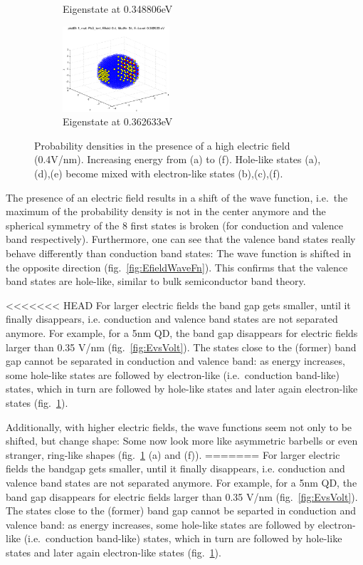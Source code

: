 \begin{figure}
\begin{subfigure}{150px}
		\caption{Eigenstate at 0.348806eV}
	\end{subfigure}
	\begin{subfigure}{150px}
		\includegraphics[width=150px]{Fig/Plots/r25v04Mod34}
		\caption{Eigenstate at 0.362633eV}
	\end{subfigure}
	\caption{Probability densities in the presence of a high electric field (0.4V/nm). Increasing energy from (a) to (f). Hole-like states (a),(d),(e) become mixed with electron-like states (b),(c),(f).}
	\label{fig:HighEfieldWaveFn}
\end{figure}


The presence of an electric field results in a shift of the wave function, i.e.~the maximum of the probability density is not in the center anymore and the spherical symmetry of the 8 first states is broken (for conduction and valence band respectively). Furthermore, one can see that the valence band states really behave differently than conduction band states: The wave function is shifted in the opposite direction (fig.~\ref{fig:EfieldWaveFn}). This confirms that the valence band states are hole-like, similar to bulk semiconductor band theory. 
	
<<<<<<< HEAD
For larger electric fields the band gap gets smaller, until it finally disappears, i.e. conduction and valence band states are not separated anymore. For example, for a 5nm  QD, the band gap disappears for electric fields larger than 0.35 V/nm (fig.~\ref{fig:EvsVolt}). The states close to the (former) band gap cannot be separated in conduction and valence band: as energy increases, some hole-like states are followed by electron-like (i.e.~conduction band-like) states, which in turn are followed by hole-like states and later again electron-like states (fig.~\ref{fig:HighEfieldWaveFn}).
	
Additionally, with higher electric fields, the wave functions seem not only to be shifted, but change shape: Some now look more like asymmetric barbells or even stranger, ring-like shapes (fig.~\ref{fig:HighEfieldWaveFn} (a) and (f)).
=======
For larger electric fields the bandgap gets smaller, until it finally disappears, i.e. conduction and valence band states are not separated anymore. For example, for a 5nm  QD, the band gap disappears for electric fields larger than 0.35 V/nm (fig.~\ref{fig:EvsVolt}). The states close to the (former) band gap cannot be separted in conduction and valence band: as energy increases, some hole-like states are followed by electron-like (i.e.~conduction band-like) states, which in turn are followed by hole-like states and later again electron-like states (fig.~\ref{fig:HighEfieldWaveFn}).
	
